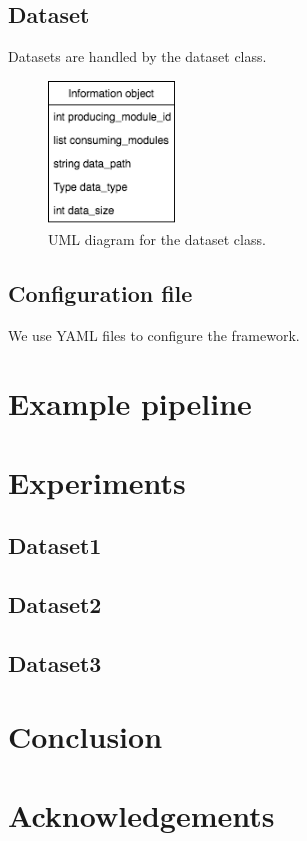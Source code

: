 \documentclass{article}
\begin{document}
    \subsection{Dataset}
    Datasets are handled by the dataset class.

    \begin{figure}[H]
        \begin{center}
            \includegraphics[width=0.3\textwidth]{fig/dataset_uml.png}
        \end{center}
        \label{fig:dataset_uml}
        \caption{UML diagram for the dataset class.}
    \end{figure}

    \subsection{Configuration file}
    We use YAML files to configure the framework.


\section{Example pipeline}

\section{Experiments}
    \subsection{Dataset1}
    \subsection{Dataset2}
    \subsection{Dataset3}

\section{Conclusion}

\section*{Acknowledgements}
\end{document}
